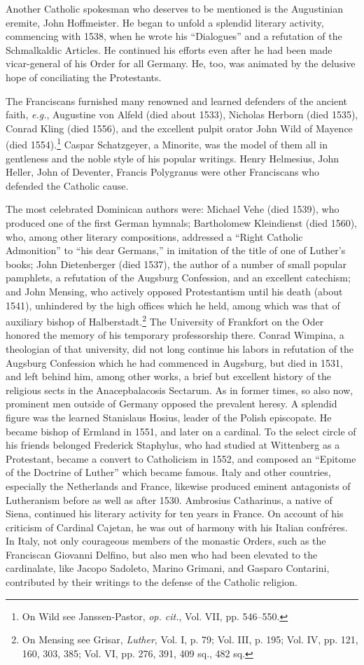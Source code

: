 Another Catholic spokesman who deserves to be mentioned is the
Augustinian eremite, John Hoffmeister. He began to unfold a splendid literary
activity, commencing with 1538, when he wrote his
“Dialogues” and a refutation of the Schmalkaldic Articles. He continued
his efforts even after he had been made vicar-general of his
Order for all Germany. He, too, was animated by the delusive hope
of conciliating the Protestants.

The Franciscans furnished many renowned and learned defenders
of the ancient faith, \textit{e.g.}, Augustine von Alfeld (died about 1533),
Nicholas Herborn (died 1535), Conrad Kling (died 1556), and the
excellent pulpit orator John Wild of Mayence (died 1554).\footnote{On Wild see Janssen-Pastor, \textit{op. cit.}, Vol. VII, pp. 546--550.}
 Caspar
Schatzgeyer, a Minorite, was the model of them all in gentleness and
the noble style of his popular writings. Henry Helmesius, John Heller,
John of Deventer, Francis Polygranus were other Franciscans who
defended the Catholic cause.

The most celebrated Dominican authors were: Michael Vehe (died
1539), who produced one of the first German hymnals; Bartholomew
Kleindienst (died 1560), who, among other literary compositions,
addressed a “Right Catholic Admonition” to “his dear Germans,” in
imitation of the title of one of Luther’s books; John Dietenberger
(died 1537), the author of a number of small popular pamphlets, a
refutation of the Augsburg Confession, and an excellent catechism;
and John Mensing, who actively opposed Protestantism until his
death (about 1541), unhindered by the high offices which he held,
among which was that of auxiliary bishop of Halberstadt.\footnote
{On Mensing see Grisar, \textit{Luther}, Vol. I, p. 79; Vol. III, p. 195; Vol. IV, pp. 121, 160,
303, 385; Vol. VI, pp. 276, 391, 409 sq., 482 sq.}
The University
of Frankfort on the Oder honored the memory of his temporary professorship
there. Conrad Wimpina, a theologian of that university, did not long continue
his labors in refutation of the Augsburg
Confession which he had commenced in Augsburg, but died in 1531,
and left behind him, among other works, a brief but excellent history
of the religious sects in the Anacepbalacosis Sectarum.
As in former times, so also now, prominent men outside of Germany
opposed the prevalent heresy. A splendid figure was the learned
Stanislaus Hosius, leader of the Polish episcopate. He became bishop
of Ermland in 1551, and later on a cardinal. To the select circle of
his friends belonged Frederick Staphylus, who had studied at Wittenberg
as a Protestant, became a convert to Catholicism in 1552, and
composed an “Epitome of the Doctrine of Luther” which became
famous. Italy and other countries, especially the Netherlands and
France, likewise produced eminent antagonists of Lutheranism before
as well as after 1530. Ambrosius Catharinus, a native of Siena, continued
his literary activity for ten years in France. On account of his
criticism of Cardinal Cajetan, he was out of harmony with his Italian
confréres. In Italy, not only courageous members of the monastic
Orders, such as the Franciscan Giovanni Delfino, but also men who
had been elevated to the cardinalate, like Jacopo Sadoleto, Marino
Grimani, and Gasparo Contarini, contributed by their writings to the
defense of the Catholic religion.
